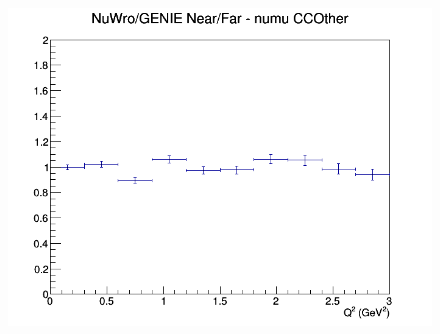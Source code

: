 \begin{figure}[h]
\endminipage
{}
\includegraphics[width=\linewidth]{eff_Q2/LAr/ratios/CCOther_NuWro_GENIE_numu_NF_Q2.png}
\endminipage
\newline
\end{figure}
\clearpage

